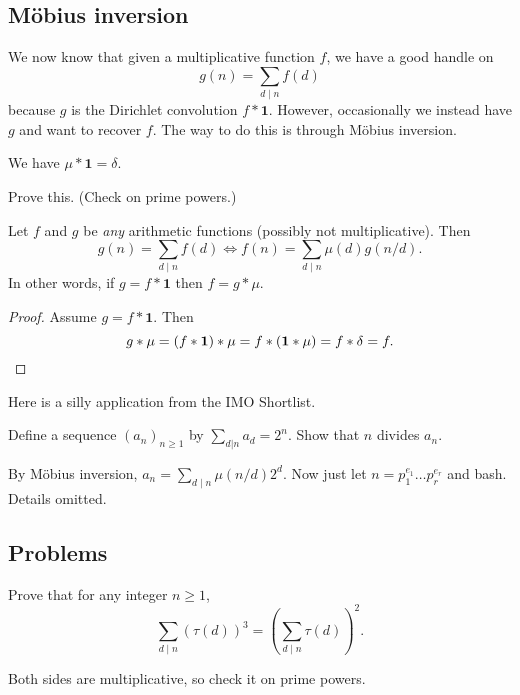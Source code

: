 \documentclass[11pt]{scrartcl}
\begin{document}
\subsection{M\"obius inversion}
We now know that given a multiplicative function $f$, we have a good handle on
\[ g(n) = \sum_{d \mid n} f(d) \]
because $g$ is the Dirichlet convolution $f \ast \mathbf 1$.
However, occasionally we instead have $g$ and want to recover $f$.
The way to do this is through M\"obius inversion.

\begin{lemma}
	We have $\mu \ast \mathbf 1 = \delta$.
\end{lemma}
\begin{exercise}
	Prove this. (Check on prime powers.)
\end{exercise}
\begin{theorem}
	Let $f$ and $g$ be \emph{any} arithmetic functions
	(possibly not multiplicative).
	Then
	\[ g(n) = \sum_{d \mid n} f(d) 
		\iff
		f(n) = \sum_{d \mid n} \mu(d) g(n/d).
	\]
	In other words, if $g = f \ast \mathbf 1$ then $f = g \ast \mu$.
\end{theorem}
\begin{proof}
	Assume $g = f \ast \mathbf 1$.
	Then
	\[
		g \ast \mu
		= (f \ast \mathbf 1) \ast \mu
		= f \ast (\mathbf 1 \ast \mu)
		= f \ast \delta = f.
		\qedhere
	\]
\end{proof}

Here is a silly application from the IMO Shortlist.
\begin{example}
	[Shortlist 1989] %
	Define a sequence $(a_n)_{n \ge 1}$ by $\sum_{d|n} a_d = 2^n$.
	Show that $n$ divides $a_n$.
\end{example}
\begin{soln}
	By M\"obius inversion, $a_n = \sum_{d \mid n} \mu(n/d) 2^d$.
	Now just let $n = p_1^{e_1} \dots p_r^{e_r}$ and bash.
	Details omitted.
\end{soln}

\subsection{Problems}
\begin{problem} %
	Prove that for any integer $n \ge 1$,
	\[ \sum_{d \mid n} (\tau(d))^3 = \left( \sum_{d \mid n} \tau(d) \right)^2. \]
	\begin{hint}
		Both sides are multiplicative, so check it on prime powers.
	\end{hint}
\end{problem}
\end{document}
